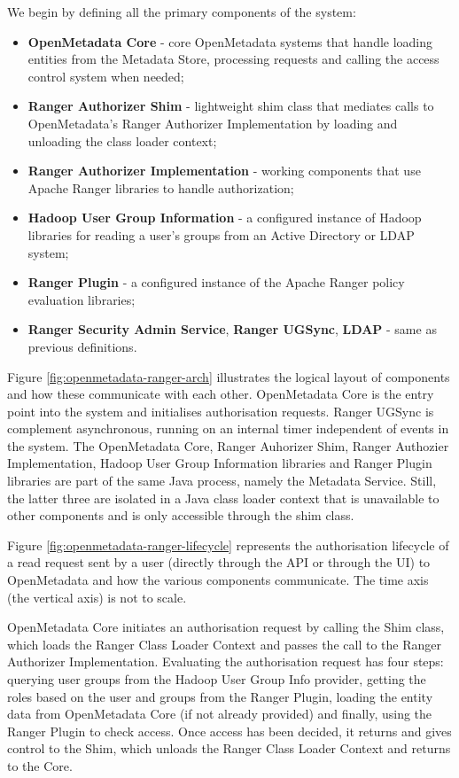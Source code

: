 We begin by defining all the primary components of the system:

\begin{itemize}
    \item \textbf{OpenMetadata Core} - core OpenMetadata systems that handle loading entities from the Metadata Store, processing requests and calling the access control system when needed;
    \item \textbf{Ranger Authorizer Shim} - lightweight shim class that mediates calls to OpenMetadata's Ranger Authorizer Implementation by loading and unloading the class loader context;
    \item \textbf{Ranger Authorizer Implementation} - working components that use Apache Ranger libraries to handle authorization;
    \item \textbf{Hadoop User Group Information} - a configured instance of Hadoop libraries for reading a user's groups from an Active Directory or LDAP system;
    \item \textbf{Ranger Plugin} - a configured instance of the Apache Ranger policy evaluation libraries;
    \item \textbf{Ranger Security Admin Service}, \textbf{Ranger UGSync}, \textbf{LDAP} - same as previous definitions.
\end{itemize}

Figure \ref{fig:openmetadata-ranger-arch} illustrates the logical layout of components and how these communicate with each other. OpenMetadata Core is the entry point into the system and initialises authorisation requests. Ranger UGSync is complement asynchronous, running on an internal timer independent of events in the system. The OpenMetadata Core, Ranger Auhorizer Shim, Ranger Authozier Implementation, Hadoop User Group Information libraries and Ranger Plugin libraries are part of the same Java process, namely the Metadata Service. Still, the latter three are isolated in a Java class loader context that is unavailable to other components and is only accessible through the shim class.

Figure \ref{fig:openmetadata-ranger-lifecycle} represents the authorisation lifecycle of a read request sent by a user (directly through the API or through the UI) to OpenMetadata and how the various components communicate. The time axis (the vertical axis) is not to scale. 

OpenMetadata Core initiates an authorisation request by calling the Shim class, which loads the Ranger Class Loader Context and passes the call to the Ranger Authorizer Implementation. Evaluating the authorisation request has four steps: querying user groups from the Hadoop User Group Info provider, getting the roles based on the user and groups from the Ranger Plugin, loading the entity data from OpenMetadata Core (if not already provided) and finally, using the Ranger Plugin to check access. Once access has been decided, it returns and gives control to the Shim, which unloads the Ranger Class Loader Context and returns to the Core.

